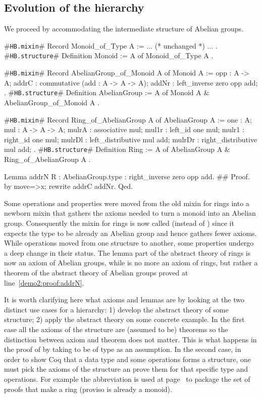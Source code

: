 \documentclass[a4paper,UKenglish,cleveref, autoref]{lipics-v2019}
\newcommand{\mixin}{mixin}
\newcommand{\phantterm}{abbreviation}
\newcommand{\hbmixin}{{\tt\color{dkgreen}HB.mixin}}
\newcommand{\hbstructure}{{\tt\color{dkgreen}HB.structure}}
\theoremstyle{implem}
\theoremstyle{implem}
\theoremstyle{command}
\theoremstyle{commands}
\begin{document}
\subsection{Evolution of the hierarchy}\label{subsec:evolution}

We proceed by accommodating the intermediate
structure of Abelian groups.

\begin{coqcode}
#\hbmixin{}# Record Monoid_of_Type A := { ... (* unchanged *) ... }.
#\hbstructure{}# Definition Monoid := { A of Monoid_of_Type A }.

#\hbmixin{}# Record AbelianGroup_of_Monoid A of Monoid A := {
  opp : A -> A;
  addrC : commutative (add : A -> A -> A);
  addNr : left_inverse zero opp add;
}.
#\hbstructure{}# Definition AbelianGroup := { A of Monoid A & AbelianGroup_of_Monoid A }.

#\hbmixin{}# Record Ring_of_AbelianGroup A of AbelianGroup A := {
  one : A;
  mul : A -> A -> A;
  mulrA : associative mul;
  mul1r : left_id one mul;              mulr1 : right_id one mul;
  mulrDl : left_distributive mul add;   mulrDr : right_distributive mul add;
}.
#\hbstructure{}# Definition Ring := { A of AbelianGroup A & Ring_of_AbelianGroup A }.

Lemma addrN {R : AbelianGroup.type} : right_inverse zero opp add.               #\label{demo2:proof:addrN}#
Proof. by move=>x; rewrite addrC addNr. Qed.
\end{coqcode}

Some operations and properties were moved from the old \mixin{} for rings
into a newborn \mixin{}  that gathers the
axioms needed to turn a monoid into an Abelian group. Consequently the \mixin{}
for rings is now called  (instead of )
since it expects the type  to be already an Abelian group and hence
gathers fewer axioms.
While operations moved from one structure to another, some properties
undergo a deep change in their status.
The lemma  part of the abstract theory of
rings is now an axiom of Abelian groups, while  is no more
an axiom of rings, but rather a theorem of the abstract theory of Abelian
groups proved at line~\ref{demo2:proof:addrN}.

It is worth clarifying here what axioms and lemmas are by looking at the
two distinct use cases for a hierarchy: 1) develop the abstract theory of some
structure; 2) apply the abstract theory on some concrete example.
In the first case
all the axioms of the structure are (assumed to be) theorems so the distinction
between axiom and theorem does not matter. This is what happens
in the proof of  by taking  to be of type
 as an assumption.
In the second case,
in order to show Coq that a data type and some operations forms a structure,
one must pick the axioms of the structure an prove them for that specific
type and operations. For example the  \phantterm{}
is used at page~\pageref{demo:theory:z:ring:axioms} to package the set
of proofs that make  a ring (proviso  is already a monoid).
\end{document}
